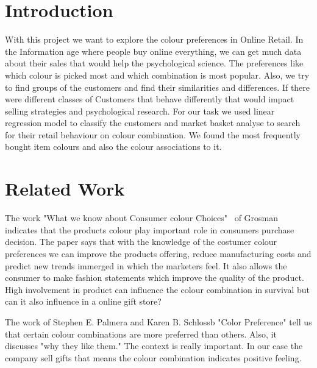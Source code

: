 \documentclass[11pt]{article}
\title{\MakeMeBlue{The colour preferences in Online Retail Store}}
\author{Uchralt Temuulen}
\date{2018 07 12}
\begin{document}
\maketitle

\section{Introduction}

With this project we want to explore the colour preferences in Online Retail. 
In the Information age where people buy online everything, we can get much data about their sales that would help the psychological science. The preferences like which colour is picked most and which combination is most popular.
Also, we try to find groups of the customers and find their similarities and differences. If there were different classes of Customers that behave differently that would impact selling strategies and psychological research. 
For our task we used linear regression model to classify the customers and market basket analyse to search for their retail behaviour on colour combination. 
We found the most frequently bought item colours and also the colour associations to it.
\\


\section{Related Work}
The work "What we know about Consumer colour Choices"~\cite{a} of Grosman indicates that the products colour play important role in consumers purchase decision.
The paper says that with the knowledge of the costumer colour preferences we can improve the products offering, reduce manufacturing costs and predict new trends immerged in which the marketers feel. It also allows the consumer to make fashion statements which improve the quality of the product. High involvement in product can influence the colour combination in survival but can it also influence in a online gift store?  


The work of Stephen E. Palmera and Karen B. Schlossb   "Color Preference"\cite{b} tell us that certain colour combinations are more preferred than others. Also, it discusses "why they like them." The context is really important. In our case the company sell gifts that means the colour combination indicates positive feeling.    
\end{document}
